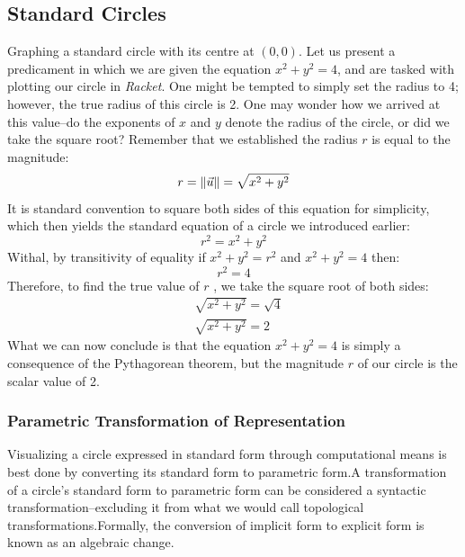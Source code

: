 \documentclass[12pt, letterpaper]{article}
\newcommand{\iRac}{\textit{Racket}}
\newcommand{\Lr}{\(r\) }
\begin{document}
	\subsection{Standard Circles}
	Graphing a standard circle with its centre at \((0,0)\).
	Let us present a predicament in which we are given the equation \(x^2 + y^2 = 4\), and are tasked with plotting our circle in \iRac. One might be tempted to simply set the radius to 4; however, the true radius of this circle is 2. One may wonder how we arrived at this value--do the exponents of \(x\) and \(y\) denote the radius of the circle, or did we take the square root? Remember that we established the radius \Lr is equal to the magnitude:
	\begin{equation*}
		r = \left\lVert\vec{u}\right\rVert = \sqrt{x^{2}+y^{2}}
	\end{equation*}
	It is standard convention to square both sides of this equation for simplicity, which then yields the standard equation of a circle we introduced earlier:
	\begin{equation*}
		r^2 = x^{2}+y^{2}
	\end{equation*}
	Withal, by transitivity of equality if \(x^2 + y^2 = r^2\) and \(x^2 + y^2 = 4\) then:\ftC
	\begin{equation*}
		r^2 = 4
	\end{equation*}
	Therefore, to find the true value of \Lr, we take the square root of both sides:
	\begin{equation*}
		\begin{split}
			&\sqrt{x^2 + y^2} = \sqrt{4} \\
			&\sqrt{x^{2}+y^{2}}=2
		\end{split}
	\end{equation*}
	What we can now conclude is that the equation \(x^{2}+y^{2}=4\) is simply a consequence of the Pythagorean theorem, but the magnitude \Lr of our circle is the scalar value of 2.
	
	\subsubsection{Parametric Transformation of Representation}
	Visualizing a circle expressed in standard form through computational means is best done by converting its standard form to parametric form.\ftB A transformation of a circle's standard form to parametric form can be considered a syntactic transformation--excluding it from what we would call topological transformations.\ftD Formally, the conversion of implicit form to explicit form is known as an algebraic change.
	
\end{document}
